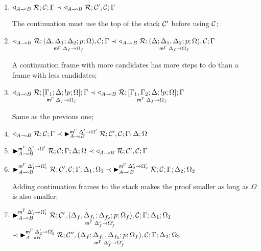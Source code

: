 \begin{enumerate}[leftmargin=*]
   \item $\contstate{A \lolli B}{\rulestk}{\lstack{C}}{\Gamma} \prec
   \contstate{A \lolli B}{\rulestk}{\lstack{C'}, \lstack{C}}{\Gamma}$

   The continuation must use the top of the stack $\lstack{C'}$ before using
   $\lstack{C}$;

   \item $\contstate{A \lolli B}{\rulestk}{\lframe{\Delta,
      \Delta_1}{\Delta_2}{p}{\Omega}{\Delta_f}{\Omega_f}, \lstack{C}}{\Gamma}
      \prec \contstate{A \lolli B}{\rulestk}{\lframe{\Delta}{\Delta_1,
         \Delta_2}{p}{\Omega}{\Delta_f}{\Omega_f}, \lstack{C}}{\Gamma}$

   A continuation frame with more candidates has more steps to do than a frame with less candidates;

   \item $\contstate{A \lolli B}{\rulestk}{\pframe{\Gamma_1}{\Delta}{\bang
      p}{\Omega}{\Delta_f}{\Omega_f}}{\Gamma} \prec \contstate{A \lolli
         B}{\rulestk}{\pframe{\Gamma_1, \Gamma_2}{\Delta}{\bang
            p}{\Omega}{\Delta_f}{\Omega_f}}{\Gamma}$

      Same as the previous one;

   \item $\contstate{A \lolli B}{\rulestk}{\lstack{C}}{\Gamma} \prec
      \matstate{A \lolli B}{\rulestk}{\lstack{C'},
         \lstack{C}}{\Gamma}{\Delta}{\Omega}{\Delta' \rightarrow \Omega'}$

   \item $\matstate{A \lolli
      B}{\rulestk}{\lstack{C}}{\Gamma}{\Delta}{\Omega}{\Delta' \rightarrow
         \Omega'} \prec \contstate{A \lolli B}{\rulestk}{\lstack{C'},
            \lstack{C}}{\Gamma}$
   \item $\matstate{A \lolli B}{\rulestk}{\lstack{C'},
      \lstack{C}}{\Gamma}{\Delta_1}{\Omega_1}{\Delta'_1 \rightarrow \Omega'_1} \prec
      \matstate{A \lolli
         B}{\rulestk}{\lstack{C}}{\Gamma}{\Delta_2}{\Omega_2}{\Delta'_2 \rightarrow
            \Omega'_2}$

   Adding continuation frames to the stack makes the proof smaller as long as
   $\Omega$ is also smaller; 

   \item $\matstate{A \lolli B}{\rulestk}{\lstack{C'}, \lframe{\Delta_f,
      \Delta_{f_1}}{\Delta_{f_2}}{p}{\Omega_f}{\Delta'_f}{\Omega'_f},
   \lstack{C}}{\Gamma}{\Delta_1}{\Omega_1}{\Delta'_1 \rightarrow \Omega'_1}$\\
   \hspace*{1cm} $\prec \matstate{A \lolli B}{\rulestk}{\lstack{C''},
      \lframe{\Delta_f}{\Delta_{f_1},
         \Delta_{f_2}}{p}{\Omega_f}{\Delta'_f}{\Omega'_f},
      \lstack{C}}{\Gamma}{\Delta_2}{\Omega_2}{\Delta'_2 \rightarrow \Omega'_2}$


\end{enumerate}
